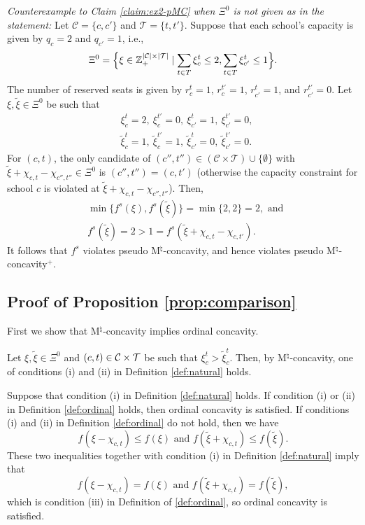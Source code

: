 \documentclass[12pt]{amsart}
\theoremstyle{remark}
\begin{document}
\medskip
\noindent
\emph{Counterexample to Claim \ref{claim:ex2-pMC} when $\Xi^0$ is not given as in the statement:}
Let $\mathcal{C}=\{c,c'\}$ and $\mathcal{T}=\{t,t'\}$. Suppose that each school's capacity is given by $q_c=2$ and $q_{c'}=1$, i.e.,
\begin{align*}
\Xi^0=\Bigl\{\xi\in \mathbb{Z}^{|\mathcal{C}|\times |\mathcal{T}|}_+ \mid \sum_{t\in T}\xi_c^t\leq 2, \sum_{t\in T}\xi_{c'}^t\leq 1\Bigr\}.
\end{align*}
The number of reserved seats is given by $r_c^t=1$, $r_c^{t'}=1$, $r_{c'}^t=1$, and $r_{c'}^{t'}=0$. Let $\xi, \tilde \xi\in \Xi^0$ be such that
\begin{align*}
&\xi_c^t=2, \: \xi_c^{t'}=0, \: \xi_{c'}^t=1, \: \xi_{c'}^{t'}=0, \\
&\tilde \xi_c^t=1, \: \tilde \xi_c^{t'}=1, \: \tilde \xi_{c'}^t=0, \: \tilde \xi_{c'}^{t'}=0.
\end{align*}
For $(c,t)$, the only candidate of $(c'',t'')\in (\mathcal{C}\times \mathcal{T})\cup\{\emptyset\}$ with $\tilde \xi+\chi_{c,t}-\chi_{c'',t''}\in \Xi^0$ is $(c'',t'')=(c,t')$ (otherwise the capacity constraint for school $c$ is violated at $\tilde \xi+\chi_{c,t}-\chi_{c'',t''}$). Then,
\begin{align*}
&\min\{f^s(\xi), f^s(\tilde \xi)\}=\min\{2,2\}=2, \text{ and } \\
&f^s(\tilde \xi)=2>1=f^s(\tilde \xi+\chi_{c,t}-\chi_{c,t'}).
\end{align*}
It follows that $f^s$ violates pseudo M$^\natural$-concavity, and hence violates pseudo M$^\natural$-concavity$^+$.


\subsection*{Proof of Proposition \ref{prop:comparison}}
First we show that M$^{\natural}$-concavity implies ordinal concavity.

Let $\xi,\tilde{\xi}\in \Xi^0$ and $(c,t) \in \mathcal{C} \times \mathcal{T}$ be such that   $\xi_c^t>\tilde{\xi}_c^t$. Then, by M$^{\natural}$-concavity, one of
conditions (i) and (ii) in Definition \ref{def:natural} holds.

Suppose that condition (i) in Definition \ref{def:natural} holds. If
condition (i) or (ii) in Definition \ref{def:ordinal} holds, then ordinal concavity
is satisfied. If conditions (i) and (ii) in Definition \ref{def:ordinal}
do not hold, then we have
\[f(\xi-\chi_{c,t})\leq f(\xi) \mbox{ and } f(\tilde \xi+\chi_{c,t}) \leq f(\tilde \xi).\]
These two inequalities together with condition (i) in Definition \ref{def:natural}
imply that
\[f(\xi-\chi_{c,t})=f(\xi) \mbox{ and } f(\tilde \xi+\chi_{c,t}) = f(\tilde \xi),\]
which is condition (iii) in Definition of \ref{def:ordinal}, so ordinal concavity is satisfied.
\end{document}
